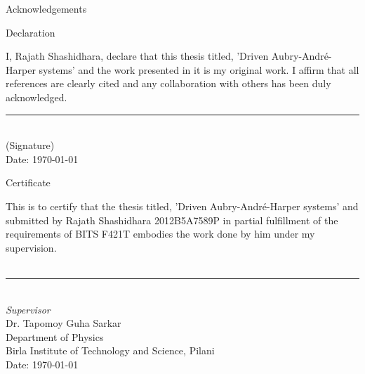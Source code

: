 \thispagestyle{empty}

\begin{center}
 \LARGE
 Acknowledgements
\end{center} \normalsize \vspace{2.0cm}
\blindtext
\vfil

\clearpage
\thispagestyle{empty}
\begin{center}
  \LARGE
  Declaration
\end{center} \normalsize \vspace{2.0cm}
I, Rajath Shashidhara, declare that this thesis titled, 
'Driven Aubry-Andr\'e-Harper systems' and 
the work presented in it is my original work. I affirm that all references are clearly cited and 
any collaboration with others has been duly acknowledged.
\vspace{5.0cm}\\
\rule[1em]{25em}{0.5pt}\\
(Signature) \vspace{0.5cm}\\
Date: \today \\
\vfil

\clearpage
\thispagestyle{empty}

\begin{center}
  \LARGE
  Certificate
\end{center} \normalsize \vspace{2.0cm}
This is to certify that the thesis titled,  
'Driven Aubry-Andr\'e-Harper systems' and submitted by
 Rajath Shashidhara 2012B5A7589P in partial fulfillment of the requirements of BITS F421T embodies the work done
 by him under my supervision.\\
\vspace{5.0cm}\\
\rule[1em]{25em}{0.5pt}\\
\large
\emph{Supervisor} \vspace{0.5cm}\\
Dr. Tapomoy Guha Sarkar\\
\normalsize
Department of Physics\\
Birla Institute of Technology and Science, Pilani \vspace{0.5cm}\\
Date: \today \\
\vfil
\tableofcontents

